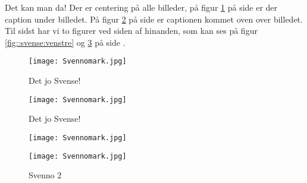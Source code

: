 \documentclass[../template/template.tex]{subfiles}
\begin{document}
Det kan man da! Der er centering på alle billeder, på figur 
\ref{fig::svense} på side \pageref{fig::svense} er der caption under billedet. 
På figur \ref{fig::svense:igen} på side \pageref{fig::svense:igen}
er captionen kommet oven over billedet. Til sidst har vi to figurer ved siden
af hinanden, som kan ses på figur \ref{fig::svense:venstre} og \ref{fig::svense:højre}
på side \pageref{fig::svense:venstre}.
\begin{figure}[hbt!]
    \centering
    \texttt{[image: Svennomark.jpg]}
    \caption{Det jo Svense!}
    \label{fig::svense}
\end{figure}
\begin{figure}[hbt!]
    \centering
    \caption{Det jo Svense!}
    \texttt{[image: Svennomark.jpg]}
    \label{fig::svense:igen}
\end{figure}

\begin{figure}[!tbp]
    \centering
    \begin{minipage}[b]{0.4\textwidth}
      \texttt{[image: Svennomark.jpg]}
      \caption{Svenno 1}
      \label{fig::svense:venstre} 
    \end{minipage}
    \hfill
    \begin{minipage}[b]{0.4\textwidth}
      \texttt{[image: Svennomark.jpg]}
      \caption{Svenno 2}
      \label{fig::svense:højre}
    \end{minipage}
\end{figure}
\clearpage
\end{document}
